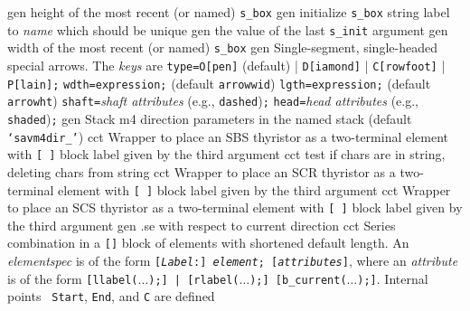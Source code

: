   {gen}
  {height of the most recent (or named) {\tt s\_box}
    }
  {gen}
  {initialize {\tt s\_box} string label to {\sl name} which should
  be unique
    }
  {gen}
  {the value of the last {\tt s\_init} argument
    }
  {gen}
  {width of the most recent (or named) {\tt s\_box}
    }
  {gen}
  {Single-segment, single-headed special arrows.
    The {\sl keys} are
       {\tt type=}{\tt O[pen]} (default)
          | {\tt D[iamond]} | {\tt C[rowfoot]} | {\tt P[lain]}{\tt ;}
       {\tt wdth=}{\tt expression}{\tt ;} (default {\tt arrowwid})
       {\tt lgth=}{\tt expression}{\tt ;} (default {\tt arrowht})
       {\tt shaft=}{\sl shaft attributes} (e.g., {\tt dashed}){\tt ;}
       {\tt head=}{\sl head attributes} (e.g., {\tt shaded}){\tt ;}
  }
  {gen}
  {Stack m4 direction parameters in the named stack
    (default {\tt `savm4dir\_'})}
  {cct}
  {Wrapper to place an SBS thyristor as a two-terminal element with
   {\tt [ ]} block label given by the third argument
    }
  {cct}
  {test if chars are in string, deleting chars from string}
  {cct}
  {Wrapper to place an SCR thyristor as a two-terminal element with
   {\tt [ ]} block label given by the third argument
    }
  {cct}
  {Wrapper to place an SCS thyristor as a two-terminal element with
   {\tt [ ]} block label given by the third argument
    }
  {gen}
  {.se with respect to current direction}
  {cct}
  { Series combination in a {\tt []} block of elements
    with shortened default length.  An {\sl elementspec} is of the
    form {\tt [{\sl Label}:] {\sl element}; [{\sl attributes}]},
    where an {\sl attribute} is of the form {\tt [llabel($\ldots$);] |
    [rlabel($\ldots$);] [b\_current($\ldots$);]}.  Internal points {\tt
    Start}, {\tt End}, and {\tt C} are defined
    }
